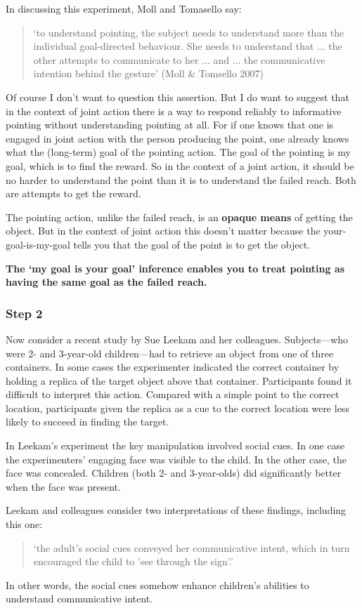 \documentclass[14pt,a4paper]{extarticle}
\begin{document}
In discussing this experiment, Moll and Tomasello say:
%
\begin{quote}
`to understand pointing, the subject needs to understand more than the individual goal-directed behaviour. She needs to understand that ... the other attempts to communicate to her ...  and ... the communicative intention behind the gesture'
(Moll \& Tomsello 2007)
\end{quote}
%
Of course I don't want to question this assertion.
But I do want to suggest that in the context of joint action there is a way to respond reliably to informative pointing without understanding pointing at all.
For if one knows that one is engaged in joint action with the person producing the point, one already knows what the (long-term) goal of the pointing action.  
The goal of the pointing is my goal, which is to find the reward.
So in the context of a joint action, it should be no harder to understand the point than it is to understand the failed reach.
Both are attempts to get the reward.

The pointing action, unlike the failed reach, is an \textbf{opaque means} of getting the object.  But in the context of joint action this doesn't matter because the your-goal-is-my-goal tells you that the goal of the point is to get the object.

\textbf{The `my goal is your goal' inference enables you to treat pointing as having the same goal as the failed reach.}

\subsubsection{Step 2}
Now consider a recent study by Sue Leekam and her colleagues.  Subjects---who were 2- and 3-year-old children---had to retrieve an object from one of three containers.  In some cases the experimenter indicated the correct container by holding a replica of the target object above that container.
Participants found it difficult to interpret this action.  Compared with a simple point to the correct location, participants given the replica as a cue to the correct location were less likely to succeed in finding the target.

In Leekam's experiment the key manipulation involved social cues.  In one case the experimenters' engaging face was visible to the child.  In the other case, the face was concealed.  Children (both 2- and 3-year-olds) did significantly better when the face was present.

Leekam and colleagues consider two interpretations of these findings, including this one:
%
\begin{quote}
`the adult’s social cues conveyed her communicative intent, which in turn encouraged the child to 'see through the sign'.'
\citep[p.\ 118]{leekam_adults_2010}
\end{quote}
%
In other words, the social cues somehow enhance children's abilities to understand communicative intent.
\end{document}
